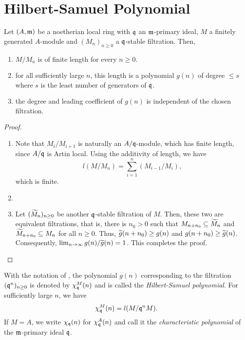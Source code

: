 \section{Hilbert-Samuel Polynomial}

\begin{proposition}
    Let $(A,\mathfrak m)$ be a noetherian local ring with $\mathfrak q$ an $\mathfrak m$-primary ideal, $M$ a finitely generated $A$-module and $(M_n)_{n\ge 0}$ a $\mathfrak q$-stable filtration. Then, 
    \begin{enumerate}[label=(\alph*)]
        \item $M/M_n$ is of finite length for every $n\ge 0$.
        \item for all sufficiently large $n$, this length is a polynomial $g(n)$ of degree $\le s$ where $s$ is the least number of generators of $\mathfrak q$.
        \item the degree and leading coefficient of $g(n)$ is independent of the chosen filtration.
    \end{enumerate}
\end{proposition}
\begin{proof}
\begin{enumerate}[label=(\alph*)]
    \item Note that $M_i/M_{i + 1}$ is naturally an $A/\mathfrak q$-module, which has finite length, since $A/\mathfrak q$ is Artin local. Using the additivity of length, we have 
    \begin{equation*}
        l(M/M_n) = \sum_{i = 1}^n (M_{i - 1}/M_i),
    \end{equation*}
    which is finite.

    \item {}

    \item Let $(\widetilde{M}_n)_{n\ge 0}$ be another $\mathfrak q$-stable filtration of $M$. Then, these two are equivalent filtrations, that is, there is $n_0 > 0$ such that $M_{n + n_0}\subseteq\widetilde{M}_n$ and $\widetilde{M}_{n + n_0}\subseteq M_n$ for all $n\ge0$. Thus, $\widetilde{g}(n + n_0)\ge g(n)$ and $g(n + n_0)\ge\widetilde{g}(n)$. Consequently, $\lim_{n\to\infty} g(n)/\widetilde{g}(n) = 1$. This completes the proof.\qedhere
\end{enumerate}
\end{proof}

\begin{definition}
    With the notation of , the polynomial $g(n)$ corresponding to the filtration $(\mathfrak q^n)_{n\ge 0}$ is denoted by $\chi_\mathfrak q^M(n)$ and is called the \emph{Hilbert-Samuel polynomial}. For sufficiently large $n$, we have 
    \begin{equation*}
        \chi_\mathfrak q^M(n) = l(M/\mathfrak q^n M).
    \end{equation*}
    If $M = A$, we write $\chi_\mathfrak q(n)$ for $\chi_\mathfrak q^A(n)$ and call it the \emph{characteristic polynomial} of the $\mathfrak m$-primary ideal $\mathfrak q$.
\end{definition}

